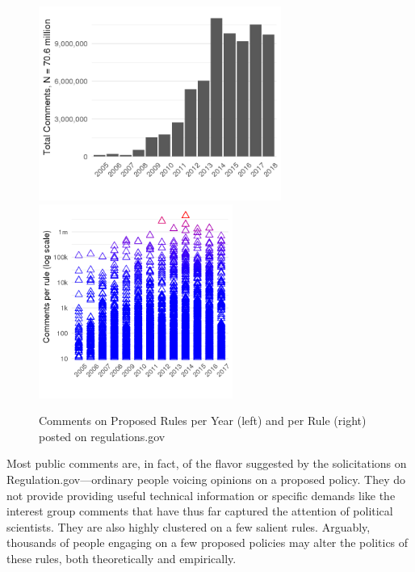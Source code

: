 \begin{figure}
\caption{Comments on Proposed Rules per Year (left) and per Rule (right) posted on regulations.gov}
\centering
\includegraphics[height= 2.5in]{Figs/comments-per-year-1.png}
\includegraphics[height= 2.5in]{Figs/rules-comments-per-year-1.png}
\label{fig:comments}
\end{figure}

Most public comments are, in fact, of the flavor suggested by the solicitations on Regulation.gov---ordinary people voicing opinions on a proposed policy. They do not provide providing useful technical information or specific demands like the interest group comments that have thus far captured the attention of political scientists. They are also highly clustered on a few salient rules. Arguably, thousands of people engaging on a few proposed policies may alter the politics of these rules, both theoretically and empirically. 

